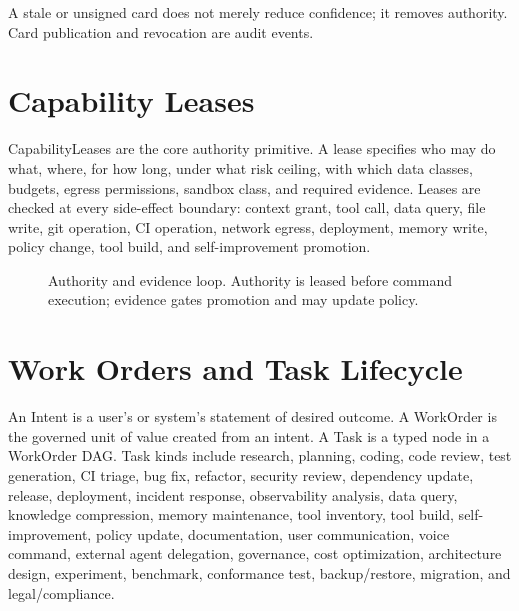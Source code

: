 \documentclass[12pt,journal,onecolumn,draftclsnofoot]{IEEEtran}
\begin{document}
A stale or unsigned card does not merely reduce confidence; it removes authority. Card publication and revocation are audit events.

\section{Capability Leases}
CapabilityLeases are the core authority primitive. A lease specifies who may do what, where, for how long, under what risk ceiling, with which data classes, budgets, egress permissions, sandbox class, and required evidence. Leases are checked at every side-effect boundary: context grant, tool call, data query, file write, git operation, CI operation, network egress, deployment, memory write, policy change, tool build, and self-improvement promotion.

\begin{figure}[!ht]
\centering
{}
\caption{Authority and evidence loop. Authority is leased before command execution; evidence gates promotion and may update policy.}
\label{fig:lease-loop}
\end{figure}

\section{Work Orders and Task Lifecycle}
An Intent is a user's or system's statement of desired outcome. A WorkOrder is the governed unit of value created from an intent. A Task is a typed node in a WorkOrder DAG. Task kinds include research, planning, coding, code review, test generation, CI triage, bug fix, refactor, security review, dependency update, release, deployment, incident response, observability analysis, data query, knowledge compression, memory maintenance, tool inventory, tool build, self-improvement, policy update, documentation, user communication, voice command, external agent delegation, governance, cost optimization, architecture design, experiment, benchmark, conformance test, backup/restore, migration, and legal/compliance.
\end{document}
